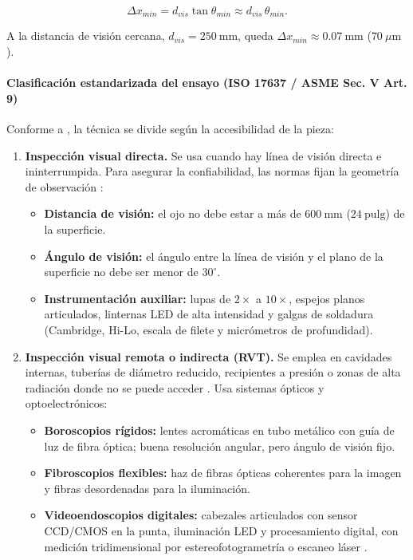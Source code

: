 \begin{equation}
  \Delta x_{min} = d_{vis}\tan\theta_{min} \approx d_{vis}\,\theta_{min}.
  \label{eq:agudeza-visual}
\end{equation}

A la distancia de visión cercana, $d_{vis} = 250\ \text{mm}$, queda
$\Delta x_{min}\approx 0.07\ \text{mm}$ ($70\ \mu\text{m}$).

\paragraph{Clasificación estandarizada del ensayo (ISO 17637 / ASME Sec. V Art. 9)}

Conforme a \parencite{asme_bpvc_v_art9, iso17637}, la técnica se divide según la
accesibilidad de la pieza:

\begin{enumerate}
  \item \textbf{Inspección visual directa.} Se usa cuando hay línea de visión directa
        e ininterrumpida. Para asegurar la confiabilidad, las normas fijan la
        geometría de observación \parencite{iso17637}:
  \begin{itemize}
    \item \textbf{Distancia de visión:} el ojo no debe estar a más de
          $600\ \text{mm}$ ($24\ \text{pulg}$) de la superficie.
    \item \textbf{Ángulo de visión:} el ángulo entre la línea de visión y el plano de
          la superficie no debe ser menor de $30^\circ$.
    \item \textbf{Instrumentación auxiliar:} lupas de $2\times$ a $10\times$, espejos
          planos articulados, linternas LED de alta intensidad y galgas de soldadura
          (Cambridge, Hi-Lo, escala de filete y micrómetros de profundidad).
  \end{itemize}
  \item \textbf{Inspección visual remota o indirecta (RVT).} Se emplea en cavidades
        internas, tuberías de diámetro reducido, recipientes a presión o zonas de
        alta radiación donde no se puede acceder \parencite{asme_bpvc_v_art9}.
        Usa sistemas ópticos y optoelectrónicos:
  \begin{itemize}
    \item \textbf{Boroscopios rígidos:} lentes acromáticas en tubo metálico con guía
          de luz de fibra óptica; buena resolución angular, pero ángulo de visión
          fijo.
    \item \textbf{Fibroscopios flexibles:} haz de fibras ópticas coherentes para la
          imagen y fibras desordenadas para la iluminación.
    \item \textbf{Videoendoscopios digitales:} cabezales articulados con sensor
          CCD/CMOS en la punta, iluminación LED y procesamiento digital, con
          medición tridimensional por estereofotogrametría o escaneo láser
          \parencite{moore2012}.
  \end{itemize}
\end{enumerate}

